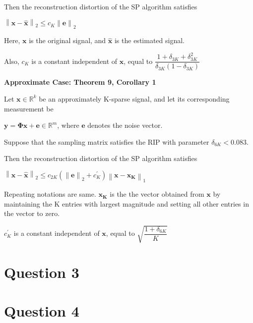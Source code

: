 \documentclass[fleqn, 11pt]{article}
\newcommand{\bs}[1]{\boldsymbol{#1}}
\newcommand\norm[1]{\left\lVert#1\right\rVert}
\newcommand{\R}[0]{\mathbb{R}}
\begin{document}
Then the reconstruction distortion of the SP algorithm satisfies
\begin{center}
    $\norm{\bs{x - \hat{x}}}_2 \leq c_K \norm{\bs{e}}_2$
\end{center}

Here, $\bs{x}$ is the original signal, and $\bs{\hat{x}}$ is the estimated signal. 

\smallskip

Also, $c_K$ is a constant independent of $\bs{x}$, equal to $\dfrac{1+\delta_{3K}+\delta_{3K}^2}{\delta_{3K}(1-\delta_{3K})}$

\smallskip

\hrulefill

\medskip


\textbf{Approximate Case: Theorem 9, Corollary 1} 

\smallskip

Let $\bs{x} \in \R^k$ be an approximately K-sparse signal, and let
its corresponding measurement be 

$\bs{y = \Phi x + e}  \in \R^m$, where $\bs{e}$  denotes the noise vector.

\smallskip

Suppose that the sampling matrix satisfies
the RIP with parameter $\delta_{6K} < 0.083 $.  

\smallskip

Then the reconstruction distortion of the SP algorithm satisfies
\begin{center}
    $\norm{\bs{x - \hat{x}}}_2 \leq c_{2K} (\norm{\bs{e}}_2 + c^{'}_{K}  ) \norm{\bs{x - x_K}}_1 $
\end{center}

Repeating notations are same. $\bs{x_K}$ is the the vector obtained from $\bs{x}$ by maintaining the
K entries with largest magnitude and setting all other entries
in the vector to zero.

\smallskip

$c^{'}_{K}$ is a constant independent of $\bs{x}$, equal to $\sqrt{\dfrac{1+\delta_{6K}}{K}}$

\hrulefill

\newpage
\section*{Question 3}
\setcounter{equation}{0}


\newpage
\section*{Question 4}
\setcounter{equation}{0}
\end{document}
